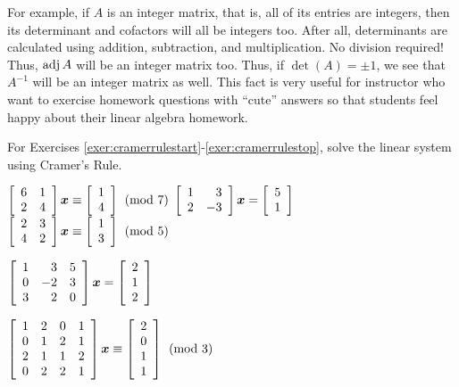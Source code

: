 For example, if $A$ is an integer matrix, that is, all of its entries are integers, then its determinant and cofactors will all be integers too. After all, determinants are calculated using addition, subtraction, and multiplication. No division required! Thus, $\adj A$ will be an integer matrix too. Thus, if $\det(A) =\pm 1$, we see that $A^{-1}$ will be an integer matrix as well. This fact is very useful for instructor who want to exercise homework questions with ``cute'' answers so that students feel happy about their linear algebra homework.\\


\noindent For Exercises \ref{exer:cramerrulestart}-\ref{exer:cramerrulestop}, solve the linear system using Cramer's Rule.
\begin{enumerate}[!HW!, start=1]
\begin{multicols}{3}
\item\label{exer:cramerrulestart} \mbox{$\mtx{rr}{6&1\\2&4}\bb x \equiv \vr{1\\4} \pmod 7$} %
\itemspade $\mtx{rr}{1&3\\2&-3}\bb x = \vr{5\\1}$
\itemspade $\mtx{rr}{2&3\\4&2}\bb x \equiv \vr{1\\3} \pmod 5$
\end{multicols}
\begin{multicols}{2}
\item $\mtx{rrr}{1&3&5\\0&-2&3\\3&2&0}\bb x = \vr{2\\1\\2}$
\item\label{exer:cramerrulestop} $\mtx{rrrr}{1&2&0&1\\0&1&2&1\\2&1&1&2\\0&2&2&1}\bb x \equiv \vr{2\\0\\1\\1} \pmod 3$
\end{multicols}
\end{enumerate}

